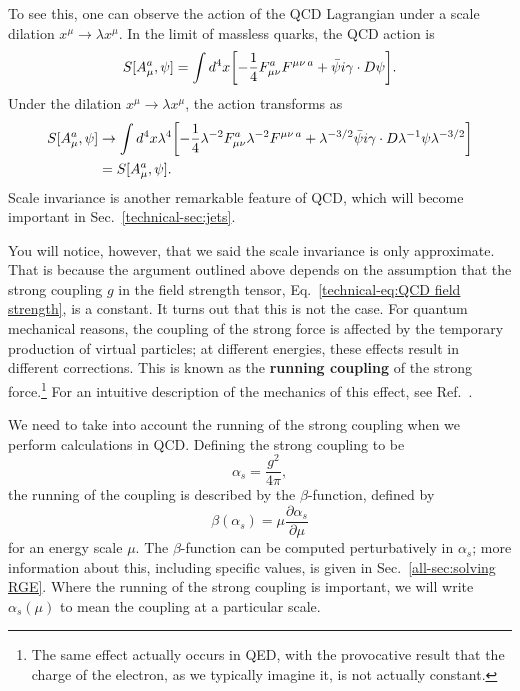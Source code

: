 \documentclass[../thesis.tex]{subfiles}
\begin{document}
	To see this, one can observe the action of the QCD Lagrangian under a scale dilation $x^\mu \to \lambda x^\mu$. In the limit of massless quarks, the QCD action is \cite{larkoski_elementary_2019-1}
	\begin{equation}
		S[A_\mu^a, \psi] = \int d^4 x \qty[-\frac{1}{4} F^a_{\mu \nu}F^{\mu\nu\,a} + \bar\psi i \gamma \cdot D \psi].
	\end{equation}
	Under the dilation $x^\mu \to \lambda x^\mu$, the action transforms as \cite{larkoski_elementary_2019-1}
	\begin{equation}
	\begin{aligned}
		S[A^a_\mu, \psi] &\to \int d^{4}x \lambda^4 \qty[-\frac{1}{4} \lambda^{-2} F^{a}_{\mu\nu}\lambda^{-2}F^{\mu\nu\,a} + \lambda^{-3/2}\bar \psi i \gamma \cdot D \lambda^{-1} \psi \lambda^{-3/2}] \\
		&= S[A_\mu^a, \psi].
	\end{aligned}
	\end{equation}
	Scale invariance is another remarkable feature of QCD, which will become important in Sec.~\ref{technical-sec:jets}.

	You will notice, however, that we said the scale invariance is only approximate. That is because the argument outlined above depends on the assumption that the strong coupling $g$ in the field strength tensor, Eq.~\ref{technical-eq:QCD field strength}, is a constant. It turns out that this is not the case. For quantum mechanical reasons, the coupling of the strong force is affected by the temporary production of virtual particles; at different energies, these effects result in different corrections. This is known as the \textbf{running coupling} of the strong force.\footnote{The same effect actually occurs in QED, with the provocative result that the charge of the electron, as we typically imagine it, is not actually constant.} For an intuitive description of the mechanics of this effect, see Ref.~\cite{larkoski_elementary_2019-1}.

	We need to take into account the running of the strong coupling when we perform calculations in QCD. Defining the strong coupling to be
	\begin{equation}
		\alpha_s = \frac{g^2}{4\pi},
	\end{equation}
	the running of the coupling is described by the $\beta$-function, defined by \cite{larkoski_elementary_2019-1}
	\begin{equation}
		\beta(\alpha_s) = \mu \frac{\partial \alpha_s}{\partial \mu}
	\end{equation}
	for an energy scale $\mu$. The $\beta$-function can be computed perturbatively in $\alpha_s$; more information about this, including specific values, is given in Sec.~\ref{all-sec:solving RGE}. Where the running of the strong coupling is important, we will write $\alpha_s(\mu)$ to mean the coupling at a particular scale.
\end{document}
